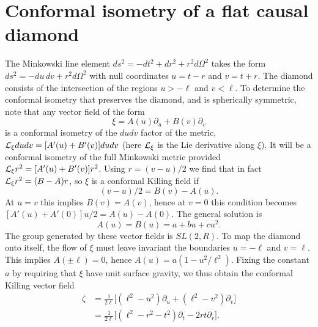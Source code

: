 \documentclass[aps,prd,showpacs,groupedaddress,nofootinbib,longbibliography,12pt]{revtex4-1}
\def\beq{\begin{equation}}
\def\eeq{\end{equation}}
\def\z{\zeta}
\def\k{\kappa}
\def\O{\Omega}
\def\L{{\cal L}}
\begin{document}
  

\section{Conformal isometry of a flat causal diamond}
\label{AppB}

The Minkowski line element $ds^2 = -dt^2 + dr^2 + r^2d\O^2$ takes the 
form $ds^2 = - du\, dv + r^2d\O^2$ with null coordinates $u=t-r$ and $v=t+r$. 
The diamond consists of the intersection of the regions $u>-\ell$ and $v<\ell$. 
To determine the conformal isometry that preserves the diamond, and is spherically symmetric, 
note that any vector field of the form 
%
\beq
\xi=A(u)\partial_u + B(v)\partial_v
\eeq
% 
is a conformal isometry of the $du dv$ factor of the metric,  $\L_\xi du dv = [A'(u) + B'(v)]dudv$ (here $\L_\xi$ is the Lie derivative along $\xi$). It will be a conformal isometry of the full Minkowski metric provided
$\L_\xi r^2 = [A'(u) + B'(v)] r^2$.  Using $r=(v-u)/2$ we find that in fact $\L_\xi r^2 = (B-A)r$, 
so $\xi$ is a conformal Killing field if 
%
\beq
[A'(u) + B'(v)] (v-u)/2 = B(v)-A(u).
\eeq
% 
At $u=v$ this implies $B(v)=A(v)$, hence at $v=0$ this condition becomes 
$[A'(u) + A'(0)] u/2 = A(u)-A(0)$. The general solution is 
%
\beq
A(u) = B(u) = a + bu + cu^2.
\eeq
% 
The group generated by these vector fields is $SL(2,R)$.
To map the diamond onto itself, the flow of $\xi$ must leave invariant the boundaries $u=-\ell$ 
and $v=\ell$. This implies $A(\pm\ell)=0$, hence $A(u) = a(1-u^2/\ell^2)$.
Fixing the constant $a$ by requiring that $\xi$ have unit surface gravity, we thus obtain
the conformal Killing vector field 
%
\begin{align}\label{zetauv}
\zeta &= \frac{1}{2\ell}\bigl[(\ell^2-u^2)\partial_u +(\ell^2-v^2)\partial_v\bigr]\\
&= \frac{1}{2\ell}\bigl[(\ell^2-r^2-t^2)\partial_t -2rt\partial_r\bigr].\label{zetatr}
\end{align}
% 
\end{document}
